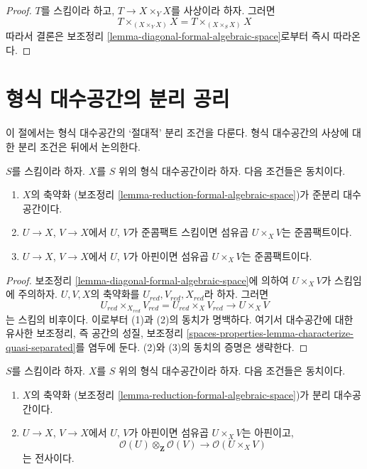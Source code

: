 \begin{proof}
$T$를 스킴이라 하고, $T \to X \times_Y X$를 사상이라 하자. 그러면
$$
T \times_{(X \times_Y X)} X = T \times_{(X \times_S X)} X
$$
따라서 결론은 보조정리
\ref{lemma-diagonal-formal-algebraic-space}로부터 즉시 따라온다.
\end{proof}

\section{형식 대수공간의 분리 공리}
\label{section-separation}

\noindent
이 절에서는 형식 대수공간의 ‘절대적’ 분리 조건을 다룬다.
형식 대수공간의 사상에 대한 분리 조건은 뒤에서 논의한다.

\begin{lemma}
\label{lemma-characterize-quasi-separated}
$S$를 스킴이라 하자. $X$를 $S$ 위의 형식 대수공간이라 하자.
다음 조건들은 동치이다.
\begin{enumerate}
\item $X$의 축약화
(보조정리 \ref{lemma-reduction-formal-algebraic-space})가
준분리 대수공간이다.
\item $U \to X$, $V \to X$에서 $U$, $V$가 준콤팩트 스킴이면
섬유곱 $U \times_X V$는 준콤팩트이다.
\item $U \to X$, $V \to X$에서 $U$, $V$가 아핀이면
섬유곱 $U \times_X V$는 준콤팩트이다.
\end{enumerate}
\end{lemma}

\begin{proof}
보조정리 \ref{lemma-diagonal-formal-algebraic-space}에 의하여
$U \times_X V$가 스킴임에 주의하자.
$U, V, X$의 축약화를 $U_{red}, V_{red}, X_{red}$라 하자.
그러면
$$
U_{red} \times_{X_{red}} V_{red} = U_{red} \times_X V_{red} \to U \times_X V
$$
는 스킴의 비후이다. 이로부터 (1)과 (2)의 동치가 명백하다.
여기서 대수공간에 대한 유사한 보조정리, 즉 공간의 성질, 보조정리
\ref{spaces-properties-lemma-characterize-quasi-separated}를 염두에 둔다.
(2)와 (3)의 동치의 증명은 생략한다.
\end{proof}

\begin{lemma}
\label{lemma-characterize-separated}
$S$를 스킴이라 하자. $X$를 $S$ 위의 형식 대수공간이라 하자.
다음 조건들은 동치이다.
\begin{enumerate}
\item $X$의 축약화
(보조정리 \ref{lemma-reduction-formal-algebraic-space})가
분리 대수공간이다.
\item $U \to X$, $V \to X$에서 $U$, $V$가 아핀이면
섬유곱 $U \times_X V$는 아핀이고,
$$
\mathcal{O}(U) \otimes_\mathbf{Z} \mathcal{O}(V)
\longrightarrow
\mathcal{O}(U \times_X V)
$$
는 전사이다.
\end{enumerate}
\end{lemma}

